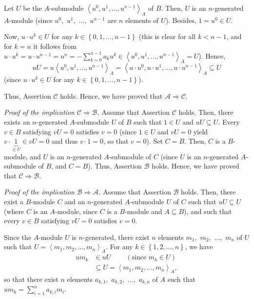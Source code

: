 \documentclass[12pt,final,notitlepage,onecolumn]{article}%
\begin{document}
Let $U$ be the $A$-submodule $\left\langle u^{0},u^{1},...,u^{n-1}%
\right\rangle _{A}$ of $B$. Then, $U$ is an $n$-generated $A$-module (since
$u^{0},$ $u^{1},$ $...,$ $u^{n-1}$ are $n$ elements of $U$). Besides,
$1=u^{0}\in U$.

Now, $u\cdot u^{k}\in U$ for any $k\in\left\{  0,1,...,n-1\right\}  $ (this is
clear for all $k<n-1$, and for $k=n$ it follows from $u\cdot u^{k}=u\cdot
u^{n-1}=u^{n}=-\sum\limits_{k=0}^{n-1}a_{k}u^{k}\in\left\langle u^{0}%
,u^{1},...,u^{n-1}\right\rangle _{A}=U$). Hence,%
\[
uU=u\left\langle u^{0},u^{1},...,u^{n-1}\right\rangle _{A}=\left\langle u\cdot
u^{0},u\cdot u^{1},...,u\cdot u^{n-1}\right\rangle _{A}\subseteq U
\]
(since $u\cdot u^{k}\in U$ for any $k\in\left\{  0,1,...,n-1\right\}  $).

Thus, Assertion $\mathcal{C}$ holds. Hence, we have proved that $\mathcal{A}%
\Longrightarrow\mathcal{C}$.

\textit{Proof of the implication }$\mathcal{C}\Longrightarrow\mathcal{B}%
$\textit{.} Assume that Assertion $\mathcal{C}$ holds. Then, there exists an
$n$-generated $A$-submodule $U$ of $B$ such that $1\in U$ and $uU\subseteq U$.
Every $v\in B$ satisfying $vU=0$ satisfies $v=0$ (since $1\in U$ and $vU=0$
yield $v\cdot\underbrace{1}_{\in U}\in vU=0$ and thus $v\cdot1=0$, so that
$v=0$). Set $C=B$. Then, $C$ is a $B$-module, and $U$ is an $n$-generated
$A$-submodule of $C$ (since $U$ is an $n$-generated $A$-submodule of $B$, and
$C=B$). Thus, Assertion $\mathcal{B}$ holds. Hence, we have proved that
$\mathcal{C}\Longrightarrow\mathcal{B}$.

\textit{Proof of the implication }$\mathcal{B}\Longrightarrow\mathcal{A}%
$\textit{.} Assume that Assertion $\mathcal{B}$ holds. Then, there exist a
$B$-module $C$ and an $n$-generated $A$-submodule $U$ of $C$ such that
$uU\subseteq U$ (where $C$ is an $A$-module, since $C$ is a $B$-module and
$A\subseteq B$), and such that every $v\in B$ satisfying $vU=0$ satisfies
$v=0$.

Since the $A$-module $U$ is $n$-generated, there exist $n$ elements $m_{1},$
$m_{2},$ $...,$ $m_{n}$ of $U$ such that $U=\left\langle m_{1},m_{2}%
,...,m_{n}\right\rangle _{A}$. For any $k\in\left\{  1,2,...,n\right\}  $, we
have%
\begin{align*}
um_{k}  &  \in uU\ \ \ \ \ \ \ \ \ \ \left(  \text{since }m_{k}\in U\right) \\
&  \subseteq U=\left\langle m_{1},m_{2},...,m_{n}\right\rangle _{A},
\end{align*}
so that there exist $n$ elements $a_{k,1},$ $a_{k,2},$ $...,$ $a_{k,n}$ of $A$
such that $um_{k}=\sum\limits_{i=1}^{n}a_{k,i}m_{i}$.
\end{document}
